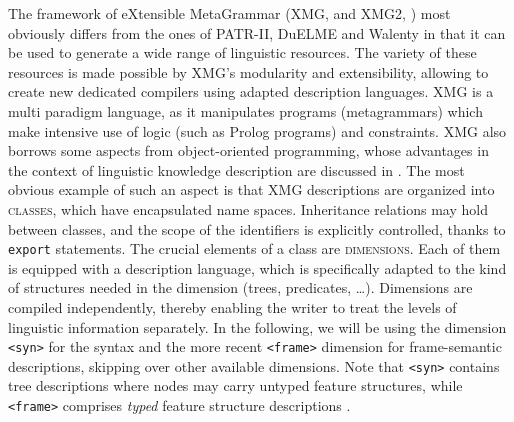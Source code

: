 \documentclass[output=paper
,modfonts
,nonflat
,biblatexbackend=biber
]{langsci/langscibook}
\begin{document}
The framework of eXtensible MetaGrammar (XMG, \citealt{crabbe:etal:13} and XMG2, \citealt{petitjean2016}) most obviously differs from the ones of PATR-II, DuELME and Walenty in that it can be used to generate a wide range of linguistic resources. The variety of these resources is made possible by XMG's modularity and extensibility, allowing to create new dedicated compilers using adapted description languages. XMG is a multi paradigm language, as it manipulates programs (metagrammars) which make intensive use of logic (such as Prolog programs) and constraints. XMG also borrows some aspects from object-oriented programming, whose advantages in the context of linguistic knowledge description are discussed in \cite{daelemans:desmedt:94}. The most obvious example of such an aspect is that XMG descriptions are organized into \textsc{classes}, which have encapsulated name spaces. Inheritance relations may hold between classes, and the scope of the identifiers is explicitly controlled, thanks to \texttt{export} statements. The crucial elements of a class are \textsc{dimensions}. Each of them is equipped with a description language, which is specifically adapted to the kind of structures needed in the dimension (trees, predicates, \ldots). Dimensions are compiled independently, thereby enabling the  writer to treat the levels of linguistic information separately. In the following, we will be using the dimension \texttt{<syn>} for the syntax and the more recent \texttt{<frame>} dimension for frame-semantic descriptions, skipping over other available dimensions. Note that \texttt{<syn>} contains tree descriptions where nodes may carry untyped feature structures, while \texttt{<frame>} comprises \textit{typed} feature structure descriptions \citep{lichte:petitjean:15}.
\end{document}
